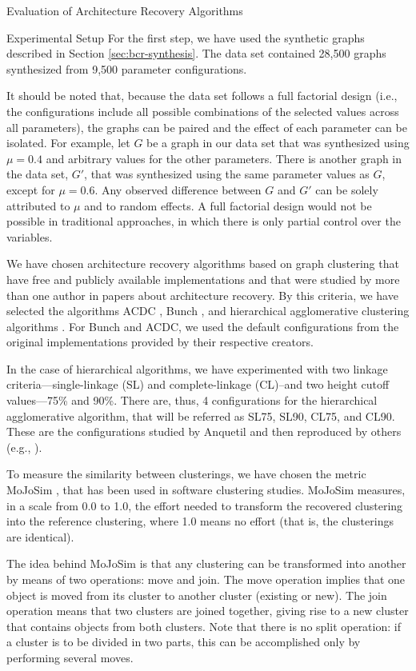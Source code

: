 \documentclass[11pt,twocolumn,a4paper,english]{article}
\begin{document}
\begin{section}{Evaluation of Architecture Recovery Algorithms}
\begin{subsection}{Experimental Setup}
	For the first step, we have used the synthetic graphs described in Section \ref{sec:bcr-synthesis}. The data set contained 28,500 graphs synthesized from 9,500 parameter configurations.
	
	It should be noted that, because the data set follows a full factorial design (i.e., the configurations include all possible combinations of the selected values across all parameters), the graphs can be paired and the effect of each parameter can be isolated. For example, let $G$ be a graph in our data set that was synthesized using $\mu = 0.4$ and arbitrary values for the other parameters. There is another graph in the data set, $G\prime$, that was synthesized using the same parameter values as $G$, except for $\mu = 0.6$. Any observed difference between $G$ and $G\prime$ can be solely attributed to $\mu$ and to random effects. A full factorial design would not be possible in traditional approaches, in which there is only partial control over the variables.
	
	We have chosen architecture recovery algorithms based on graph clustering that have free and publicly available implementations and that were studied by more than one author in papers about architecture recovery. By this criteria, we have selected the algorithms ACDC \cite{Tzerpos2000}, Bunch \cite{Mancoridis1998}, and hierarchical agglomerative clustering algorithms \cite{Anquetil1999}. For Bunch and ACDC, we used the default configurations from the original implementations provided by their respective creators.
		
	In the case of hierarchical algorithms, we have experimented with two linkage criteria---single-linkage (SL) and complete-linkage (CL)--and two height cutoff values---75\% and 90\%. There are, thus, 4 configurations for the hierarchical agglomerative algorithm, that will be referred as SL75, SL90, CL75, and CL90. These are the configurations studied by Anquetil  \cite{Anquetil1999,Anquetil2003} and then reproduced by others (e.g., \cite{Wu2005}).
	
	To measure the similarity between clusterings, we have chosen the metric MoJoSim \cite{Bittencourt2009}, that has been used in software clustering studies. MoJoSim measures, in a scale from 0.0 to 1.0, the effort needed to transform the recovered clustering into the reference clustering, where 1.0 means no effort (that is, the clusterings are identical).
	
	The idea behind MoJoSim is that any clustering can be transformed into another by means of two operations: move and join. The move operation implies that one object is moved from its cluster to another cluster (existing or new). The join operation means that two clusters are joined together, giving rise to a new cluster that contains objects from both clusters. Note that there is no split operation: if a cluster is to be divided in two parts, this can be accomplished only by performing several moves.
	

\end{subsection}
\end{section}
\end{document}
